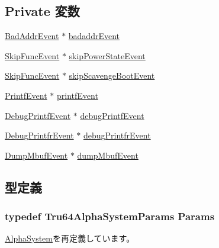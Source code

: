 \subsection*{Private 変数}
\begin{DoxyCompactItemize}
\item 
\hyperlink{classBadAddrEvent}{BadAddrEvent} $\ast$ \hyperlink{classTru64AlphaSystem_a37f3e64c0283c4b56e4ac9f84703a383}{badaddrEvent}
\item 
\hyperlink{classSkipFuncEvent}{SkipFuncEvent} $\ast$ \hyperlink{classTru64AlphaSystem_a407a966423a15e11460e80306a4f83f5}{skipPowerStateEvent}
\item 
\hyperlink{classSkipFuncEvent}{SkipFuncEvent} $\ast$ \hyperlink{classTru64AlphaSystem_a33f06e57e60ec95b342c46ce08e2f701}{skipScavengeBootEvent}
\item 
\hyperlink{classPrintfEvent}{PrintfEvent} $\ast$ \hyperlink{classTru64AlphaSystem_a8be1f28bfc8ec71e81ee00d98c940a3a}{printfEvent}
\item 
\hyperlink{classDebugPrintfEvent}{DebugPrintfEvent} $\ast$ \hyperlink{classTru64AlphaSystem_af8fd2e4dd39197b0e5a01f8f2502cbf6}{debugPrintfEvent}
\item 
\hyperlink{classDebugPrintfrEvent}{DebugPrintfrEvent} $\ast$ \hyperlink{classTru64AlphaSystem_a7b780886f04c6ba2135c73494e54c61b}{debugPrintfrEvent}
\item 
\hyperlink{classDumpMbufEvent}{DumpMbufEvent} $\ast$ \hyperlink{classTru64AlphaSystem_abcfe13a24a681930f77680a961dc75ca}{dumpMbufEvent}
\end{DoxyCompactItemize}


\subsection{型定義}
\hypertarget{classTru64AlphaSystem_a653e3d38e55079cc093cc4945c1ac3d1}{
\subsubsection[{Params}]{\setlength{\rightskip}{0pt plus 5cm}typedef Tru64AlphaSystemParams {\bf Params}}}
\label{classTru64AlphaSystem_a653e3d38e55079cc093cc4945c1ac3d1}


\hyperlink{classAlphaSystem_a2af24d7a564ee2ca81332fb46406cbe5}{AlphaSystem}を再定義しています。

